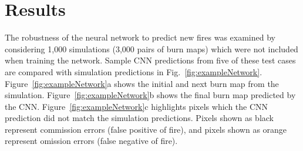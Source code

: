 \documentclass[smallcondensed]{svjour3}     %
\begin{document}
\section{Results}
\label{s:Results}

The robustness of the neural network to predict new fires was examined
by considering 1,000 simulations (3,000 pairs of burn maps) which were not
included when training the network.
Sample CNN predictions from five of these test cases are
compared with simulation predictions in Fig.~\ref{fig:exampleNetwork}.
Figure~\ref{fig:exampleNetwork}a shows the initial and next burn map
from the simulation.
Figure~\ref{fig:exampleNetwork}b shows the final burn map predicted by the CNN.
Figure~\ref{fig:exampleNetwork}c highlights pixels which the CNN prediction did not match
the simulation predictions. Pixels shown as black represent commission
errors (false positive of fire), and pixels shown as orange represent omission errors
(false negative of fire).
\end{document}
